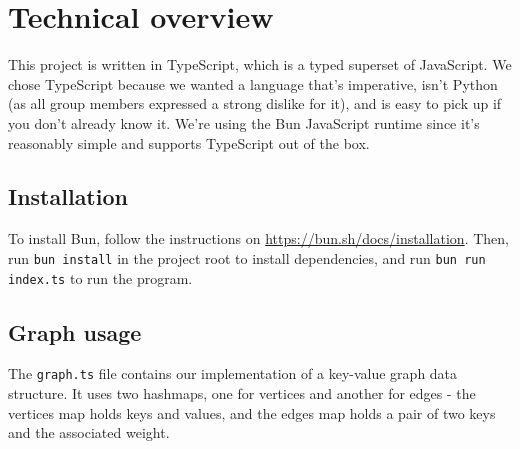 \documentclass{homework}
\begin{document}
\section{Technical overview}
This project is written in TypeScript, which is a typed superset of JavaScript.
We chose TypeScript because we wanted a language that's imperative, isn't Python (as all group members expressed a strong dislike for it), and is easy to pick up if you don't already know it.
We're using the Bun JavaScript runtime since it's reasonably simple and supports TypeScript out of the box.

\subsection{Installation}
To install Bun, follow the instructions on \url{https://bun.sh/docs/installation}.
Then, run \texttt{bun install} in the project root to install dependencies, and run \texttt{bun run index.ts} to run the program.

\subsection{Graph usage}
The \texttt{graph.ts} file contains our implementation of a key-value graph data structure.
It uses two hashmaps, one for vertices and another for edges - the vertices map holds keys and values, and the edges map holds a pair of two keys and the associated weight.
\end{document}
